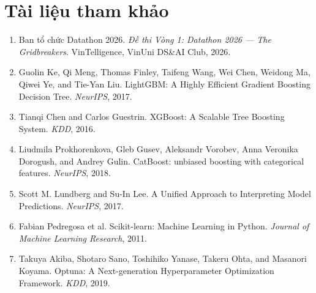 \documentclass{article}
\begin{document}
\clearpage
\section*{Tài liệu tham khảo}
\small
\begin{enumerate}[leftmargin=1.5em]
    \item Ban tổ chức Datathon 2026. \textit{Đề thi Vòng 1: Datathon 2026 --- The Gridbreakers}. VinTelligence, VinUni DS\&AI Club, 2026.
    \item Guolin Ke, Qi Meng, Thomas Finley, Taifeng Wang, Wei Chen, Weidong Ma, Qiwei Ye, and Tie-Yan Liu. LightGBM: A Highly Efficient Gradient Boosting Decision Tree. \textit{NeurIPS}, 2017.
    \item Tianqi Chen and Carlos Guestrin. XGBoost: A Scalable Tree Boosting System. \textit{KDD}, 2016.
    \item Liudmila Prokhorenkova, Gleb Gusev, Aleksandr Vorobev, Anna Veronika Dorogush, and Andrey Gulin. CatBoost: unbiased boosting with categorical features. \textit{NeurIPS}, 2018.
    \item Scott M. Lundberg and Su-In Lee. A Unified Approach to Interpreting Model Predictions. \textit{NeurIPS}, 2017.
    \item Fabian Pedregosa et al. Scikit-learn: Machine Learning in Python. \textit{Journal of Machine Learning Research}, 2011.
    \item Takuya Akiba, Shotaro Sano, Toshihiko Yanase, Takeru Ohta, and Masanori Koyama. Optuna: A Next-generation Hyperparameter Optimization Framework. \textit{KDD}, 2019.
\end{enumerate}
\end{document}
